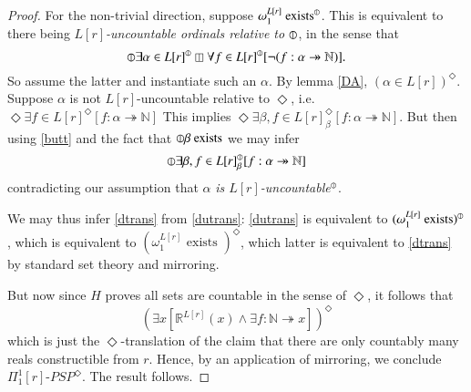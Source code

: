\documentclass{article}
\newcommand\D{\circledbar}
\newcommand\B{\boxbar}
\begin{document}
\begin{proof}
For the non-trivial direction, suppose $\omega_1^{L[r]} \text{ exists}^{\D}$. 
This is equivalent to there being \emph{$L[r]$-uncountable ordinals relative to $\D$}, in the sense that
\[\D \exists \alpha \in L[r]^{\D} \B \forall f \in L[r]^{\D}[\neg(f : \alpha \twoheadrightarrow \mathbb{N})].\]
So assume the latter and instantiate such an $\alpha$. 
By lemma \ref{DA}, $(\alpha \in L[r])^\Diamond$. Suppose $\alpha$ is not
$L[r]$-uncountable relative to $\Diamond$, i.e. 
$\Diamond \exists f \in L[r]^\Diamond[f : \alpha \twoheadrightarrow \mathbb{N}]$
This implies 
$\Diamond \exists \beta, f \in L[r]_\beta^\Diamond[f : \alpha \twoheadrightarrow \mathbb{N}]$. 
But then using \eqref{butt} and the fact that $\D \beta \text{ exists}$ we may infer
\[\D \exists \beta, f \in L[r]_\beta^{\D}[f : \alpha \twoheadrightarrow \mathbb{N}]\]
contradicting our assumption that $\alpha$ \emph{is $L[r]$-uncountable}$^{\D}$.

We may thus infer \eqref{dtrans} from \eqref{dutrans}: \eqref{dutrans} is equivalent to 
$(\omega_1^{L[r]} \text{ exists})^{\D}$, which is equivalent to 
$(\omega_1^{L[r]} \text{ exists })^\Diamond$,
which latter is equivalent to \eqref{dtrans} by standard set theory and mirroring. 

But now since $H$ proves all sets are countable in the sense of $\Diamond$, it follows that 
\begin{equation}
    (\exists x[\mathbb{R}^{L[r]}(x) \wedge \exists f : \mathbb{N} \twoheadrightarrow x])^\Diamond
\end{equation}
which is just the $\Diamond$-translation of the claim that there are only countably many 
reals constructible from $r$. Hence, by an application of mirroring, we conclude $\Pi_1^1[r]$-$PSP^\Diamond$.
The result follows.

\end{proof}


\end{document}
